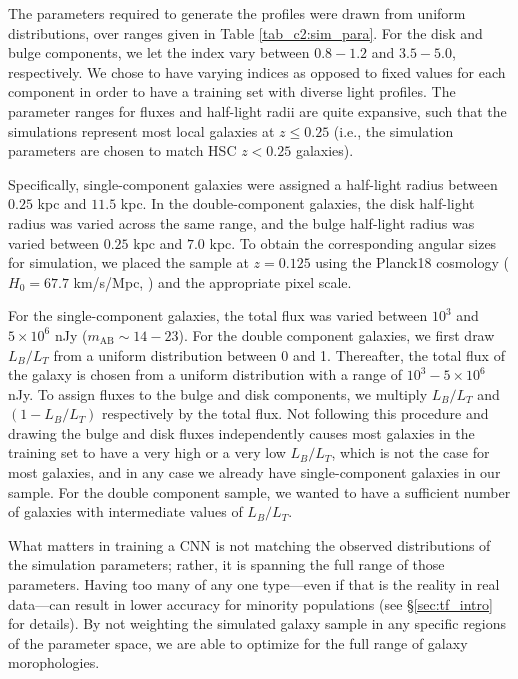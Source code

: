 The parameters required to generate the \sersic{} profiles were drawn from uniform distributions, over ranges given in Table \ref{tab_c2:sim_para}. For the disk and bulge components, we let the \sersic{} index vary between $0.8-1.2$ and $3.5-5.0$, respectively. We chose to have varying \sersic{} indices as opposed to fixed values for each component in order to have a training set with diverse light profiles. The parameter ranges for fluxes and half-light radii are quite expansive, such that the simulations represent most local galaxies \citep{binney_and_merrifield} at $z \leq 0.25$ (i.e., the simulation parameters are chosen to match HSC $z < 0.25$ galaxies).

Specifically, single-component galaxies were assigned a half-light radius between $0.25$ kpc and $11.5$ kpc. In the double-component galaxies, the disk half-light radius was varied across the same range, and the bulge half-light radius was varied between $0.25$ kpc and $7.0$ kpc. To obtain the corresponding angular sizes for simulation, we placed the sample at $ z = 0.125$ using the Planck18 cosmology ($H_0=67.7$ km/s/Mpc, \citealp{planck18}) and the appropriate pixel scale.

For the single-component galaxies, the total flux was varied between $10^3$ and $5\times10^6$ nJy ($m_{\mathrm{AB}}\sim14 - 23$). For the double component galaxies, we first draw $L_B/L_T$ from a uniform distribution between 0 and 1. Thereafter, the total flux of the galaxy is chosen from a uniform distribution with a range of $10^3 - 5\times10^6$ nJy. To assign fluxes to the bulge and disk components, we multiply $L_B/L_T$ and $(1 - L_B/L_T)$ respectively by the total flux. Not following this procedure and drawing the bulge and disk fluxes independently causes most galaxies in the training set to have a very high or a very low $L_B/L_T$, which is not the case for most galaxies, and in any case we already have single-component galaxies in our sample. For the double component sample, we wanted to have a sufficient number of galaxies with intermediate values of $L_B/L_T$.

What matters in training a CNN is not matching the observed distributions of the simulation parameters; rather, it is spanning the full range of those parameters. 
Having too many of any one type---even if that is the reality in real data---can result in lower accuracy for minority populations (see \S \ref{sec:tf_intro} for details).
By not weighting the simulated galaxy sample in any specific regions of the parameter space, we are able to optimize \gampen{} for the full range of galaxy morophologies.

